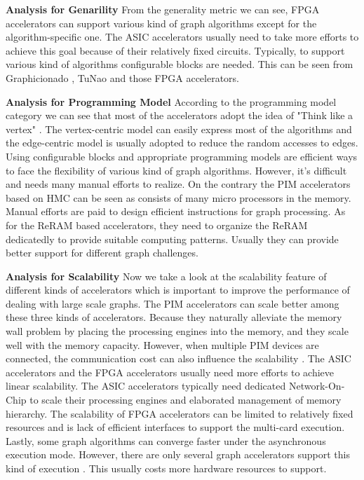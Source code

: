 \documentclass[twoside]{article}
\begin{document}
\begin{multicols}{2}
{\bf Analysis for Genarility} From the generality metric we can see, FPGA accelerators can support various kind of graph algorithms except for the algorithm-specific one. The ASIC accelerators usually need to take more efforts to achieve this goal because of their relatively fixed circuits. Typically, to support various kind of algorithms configurable blocks are needed. This can be seen from Graphicionado \cite{ham2016graphicionado}, TuNao \cite{zhou2017tunao} and those FPGA accelerators. 

{\bf Analysis for Programming Model} According to the programming model category we can see that most of the accelerators adopt the idea of "Think like a vertex" \cite{tian2013think}. The vertex-centric model can easily express most of the algorithms and the edge-centric model is usually adopted to reduce the random accesses to edges. Using configurable blocks and appropriate programming models are efficient ways to face the flexibility of various kind of graph algorithms. However, it's difficult and needs many manual efforts to realize. On the contrary the PIM accelerators based on HMC can be seen as consists of many micro processors in the memory. Manual efforts are paid to design efficient instructions for graph processing. As for the ReRAM based accelerators, they need to organize the ReRAM dedicatedly to provide suitable computing patterns. Usually they can provide better support for different graph challenges. 

{\bf Analysis for Scalability} Now we take a look at the scalability feature of different kinds of accelerators which is important to improve the performance of dealing with large scale graphs. The PIM accelerators can scale better among these three kinds of accelerators. Because they naturally alleviate the memory wall problem by placing the processing engines into the memory, and they scale well with the memory capacity. However, when multiple PIM devices are connected, the communication cost can also influence the scalability \cite{ahn2015tesseract,zhang2018graphp}. The ASIC accelerators and the FPGA accelerators usually need more efforts to achieve linear scalability. The ASIC accelerators typically need dedicated Network-On-Chip to scale their processing engines and elaborated management of memory hierarchy. The scalability of FPGA accelerators can be limited to relatively fixed resources and is lack of efficient interfaces to support the multi-card execution. Lastly, some graph algorithms can converge faster under the asynchronous execution mode. However, there are only several graph accelerators support this kind of execution \cite{ozdal2016energy,Ma2017fpgahtm}. This usually costs more hardware resources to support. 


\end{multicols}
\end{document}
